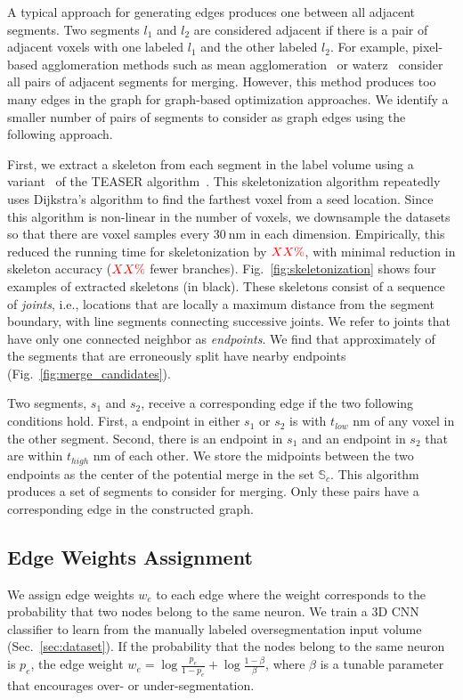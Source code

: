 A typical approach for generating edges produces one between all adjacent segments. 
Two segments $l_1$ and $l_2$ are considered adjacent if there is a pair of adjacent voxels with one labeled $l_1$ and the other labeled $l_2$.
For example, pixel-based agglomeration methods such as mean agglomeration~\cite{lee2017superhuman} or waterz~\cite{funke2017deep} consider all pairs of adjacent segments for merging.
However, this method produces too many edges in the graph for graph-based optimization approaches. 
We identify a smaller number of pairs of segments to consider as graph edges using the following approach.

First, we extract a skeleton from each segment in the label volume using a variant~\cite{zhao2014automatic} of the TEASER algorithm~\cite{sato2000teasar}. 
This skeletonization algorithm repeatedly uses Dijkstra's algorithm to find the farthest voxel from a seed location. 
Since this algorithm is non-linear in the number of voxels, we downsample the datasets so that there are voxel samples every $\SI{30}{\nano\meter}$ in each dimension.
Empirically, this reduced the running time for skeletonization by $\textcolor{red}{XX\%}$, with minimal reduction in skeleton accuracy ($\textcolor{red}{XX\%}$ fewer branches). 
Fig.~\ref{fig:skeletonization} shows four examples of extracted skeletons (in black). 
These skeletons consist of a sequence of \textit{joints}, i.e., locations that are locally a maximum distance from the segment boundary, with line segments connecting successive joints. 
We refer to joints that have only one connected neighbor as \textit{endpoints}. 
We find that approximately  of the segments that are erroneously split have nearby endpoints (Fig.~\ref{fig:merge_candidates}). 

Two segments, $s_1$ and $s_2$, receive a corresponding edge if the two following conditions hold.
First, a endpoint in either $s_1$ or $s_2$ is with $t_{low}$ nm of any voxel in the other segment.
Second, there is an endpoint in $s_1$ and an endpoint in $s_2$ that are within $t_{high}$ nm of each other.
We store the midpoints between the two endpoints as the center of the potential merge in the set $\mathbb{S}_c$. 
This algorithm produces a set of segments to consider for merging. 
Only these pairs have a corresponding edge in the constructed graph.


\subsection{Edge Weights Assignment}
\label{sec:edge-weights}
We assign edge weights $w_e$ to each edge where the weight corresponds to the probability that two nodes belong to the same neuron.
We train a 3D CNN classifier to learn from the manually labeled oversegmentation input volume (Sec.~\ref{sec:dataset}).
If the probability that the nodes belong to the same neuron is $p_e$, the edge weight $w_e = \log{\frac{p_e}{1 - p_e}} + \log{\frac{1 - \beta}{\beta}}$, where $\beta$ is a tunable parameter that encourages over- or under-segmentation.

